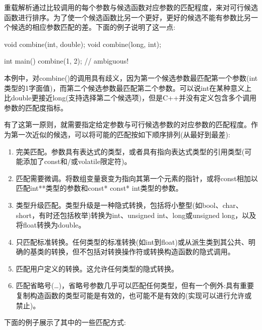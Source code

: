 
重载解析通过比较调用的每个参数与候选函数对应参数的匹配程度，来对可行候选函数进行排序。为了使一个候选函数比另一个更好，更好的候选不能有参数比另一个候选的相应参数匹配的差。下面的例子说明了这一点:

\begin{cpp}
void combine(int, double);
void combine(long, int);

int main()
{
	combine(1, 2); // ambiguous!
}
\end{cpp}

本例中，对combine()的调用具有歧义，因为第一个候选参数最匹配第一个参数(int类型的1字面值)，而第二个候选参数最匹配第二个参数。可以说int在某种意义上比double更接近long(支持选择第二个候选项)，但是C++并没有定义包含多个调用参数的匹配度指标。

有了这第一原则，就需要指定给定参数与可行候选参数的对应参数的匹配程度。作为第一次近似的候选，可以将可能的匹配按如下顺序排列(从最好到最差):

\begin{enumerate}
\item 
完美匹配。参数具有表达式的类型，或者具有指向表达式类型的引用类型(可能添加了const和/或volatile限定符)。

\item 
匹配需要微调。将数组变量衰变为指向其第一个元素的指针，或将const相加以匹配int**类型的参数和const* const* int类型的参数。


\item 
类型升级匹配。类型升级是一种隐式转换，包括将小整型(如bool、char、short，有时还包括枚举)转换为int、unsigned int、long或unsigned long，以及将float转换为double。


\item 
只匹配标准转换。任何类型的标准转换(如int到float)或从派生类到其公共、明确的基类的转换，但不包括对转换操作符或转换构造函数的隐式调用。


\item 
匹配用户定义的转换。这允许任何类型的隐式转换。


\item 
匹配省略号(…)，省略号参数几乎可以匹配任何类型，但有一个例外:具有重要复制构造函数的类型可能是有效的，也可能不是有效的(实现可以进行允许或禁止)。
\end{enumerate}

下面的例子展示了其中的一些匹配方式:


